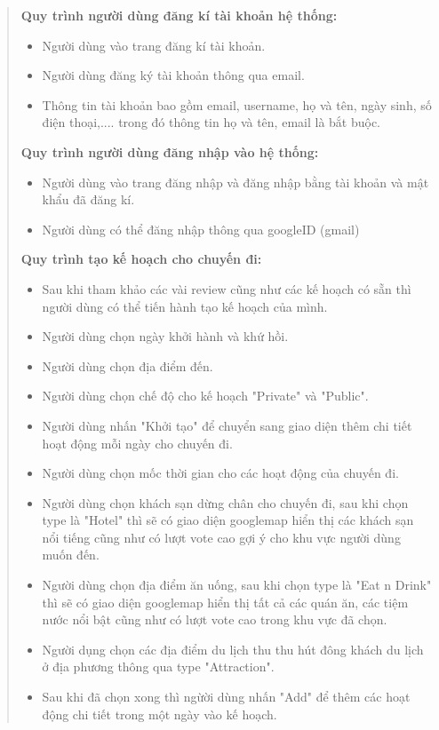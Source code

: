 \begin{quote}
    \textbf{Quy trình người dùng đăng kí tài khoản hệ thống: }
    \begin{itemize}
        \item Người dùng vào trang đăng kí tài khoản.
        \item Người dùng đăng ký tài khoản thông qua email.
        \item Thông tin tài khoản bao gồm email, username, họ và tên, ngày sinh, số điện thoại,.... trong đó thông tin họ và tên, email là bắt buộc.
    \end{itemize}
    \textbf{Quy trình người dùng đăng nhập vào hệ thống: }
    \begin{itemize}
        \item Người dùng vào trang đăng nhập và đăng nhập bằng tài khoản và mật khẩu đã đăng kí.
        \item Người dùng có thể đăng nhập thông qua googleID (gmail)
    \end{itemize}
    \textbf{Quy trình tạo kế hoạch cho chuyến đi: }
    \begin{itemize}
        \item Sau khi tham khảo các vài review cũng như các kế hoạch có sẵn thì người dùng có thể tiến hành tạo kế hoạch của mình.
        \item Người dùng chọn ngày khởi hành và khứ hồi.
        \item Người dùng chọn địa điểm đến.  
        \item Người dùng chọn chế độ cho kế hoạch "Private" và "Public".
        \item Người dùng nhấn "Khởi tạo" để chuyển sang giao diện thêm chi tiết hoạt động mỗi ngày cho chuyến đi.
        \item Người dùng chọn mốc thời gian cho các hoạt động của chuyến đi.
        \item Người dùng chọn khách sạn dừng chân cho chuyến đi, sau khi chọn type là "Hotel" thì sẽ có giao diện googlemap hiển thị các khách sạn nổi tiếng cũng như có lượt vote cao gợi ý cho khu vực người dùng muốn đến.
        \item Người dùng chọn địa điểm ăn uống, sau khi chọn type là "Eat n Drink" thì sẽ có giao diện googlemap hiển thị tất cả các quán ăn, các tiệm nước nổi bật cũng như có lượt vote cao trong khu vực đã chọn.
        \item Người dụng chọn các địa điểm du lịch thu thu hút đông khách du lịch ở địa phương thông qua type "Attraction".
        \item Sau khi đã chọn xong thì ngừời dùng nhấn "Add" để thêm các hoạt động chi tiết trong một ngày vào kế hoạch.
        

\end{itemize}
\end{quote}
